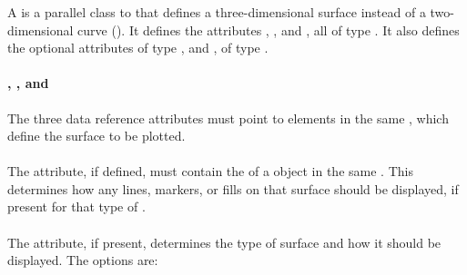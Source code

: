 \subsubsection{}
\label{class:surface}
\begin{blockChanged}
A \Surface is a parallel class to \AbstractCurve that defines a three-dimensional surface instead of a two-dimensional curve ().  It defines the  attributes , , and , all of type \SIdRef.  It also defines the optional attributes  of type \SIdRef, and , of type \SurfaceType.


\paragraph*{, , and }
The three data reference attributes must point to \DataGenerator elements in the same \SedDocument, which define the surface to be plotted.  

\paragraph*{}
The  attribute, if defined, must contain the  of a \Style object in the same \SedDocument.  This \Style determines how any lines, markers, or fills on that surface should be displayed, if present for that type of \Surface.

\paragraph*{}
The  attribute, if present, determines the type of surface and how it should be displayed.  The options are:


\end{blockChanged}
